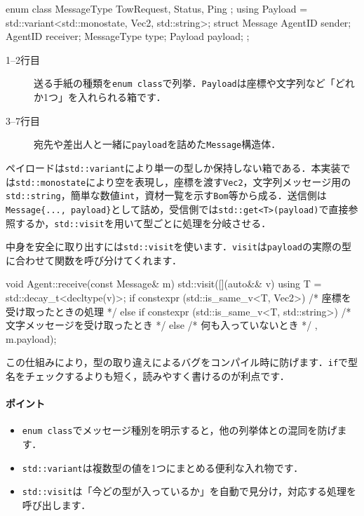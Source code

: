 \documentclass[10pt,letterpaper]{jsarticle}
\begin{document}
\begin{cppcode}
enum class MessageType { TowRequest, Status, Ping };
using Payload = std::variant<std::monostate, Vec2, std::string>;
struct Message {
    AgentID sender;
    AgentID receiver;
    MessageType type;
    Payload payload;
};
\end{cppcode}
\begin{description}
  \item[1--2行目] 送る手紙の種類を\texttt{enum class}で列挙．\texttt{Payload}は座標や文字列など「どれか1つ」を入れられる箱です．
  \item[3--7行目] 宛先や差出人と一緒に\texttt{payload}を詰めた\texttt{Message}構造体．
\end{description}

ペイロードは\texttt{std::variant}により単一の型しか保持しない箱である．本実装では\texttt{std::monostate}により空を表現し，座標を渡す\texttt{Vec2}，文字列メッセージ用の\texttt{std::string}，簡単な数値\texttt{int}，資材一覧を示す\texttt{Bom}等から成る．送信側は\texttt{Message\{..., payload\}}として詰め，受信側では\texttt{std::get<T>(payload)}で直接参照するか，\texttt{std::visit}を用いて型ごとに処理を分岐させる．

中身を安全に取り出すには\texttt{std::visit}を使います．\texttt{visit}は\texttt{payload}の実際の型に合わせて関数を呼び分けてくれます．

\begin{cppcode}
void Agent::receive(const Message& m) {
    std::visit([](auto&& v){
        using T = std::decay_t<decltype(v)>;
        if constexpr (std::is_same_v<T, Vec2>) {
            /* 座標を受け取ったときの処理 */
        } else if constexpr (std::is_same_v<T, std::string>) {
            /* 文字メッセージを受け取ったとき */
        } else {
            /* 何も入っていないとき */
        }
    }, m.payload);
}
\end{cppcode}

この仕組みにより，型の取り違えによるバグをコンパイル時に防げます．\texttt{if}で型名をチェックするよりも短く，読みやすく書けるのが利点です．

\paragraph{ポイント}
\begin{itemize}
  \item \texttt{enum class}でメッセージ種別を明示すると，他の列挙体との混同を防げます．
  \item \texttt{std::variant}は複数型の値を1つにまとめる便利な入れ物です．
  \item \texttt{std::visit}は「今どの型が入っているか」を自動で見分け，対応する処理を呼び出します．
\end{itemize}
\end{document}
